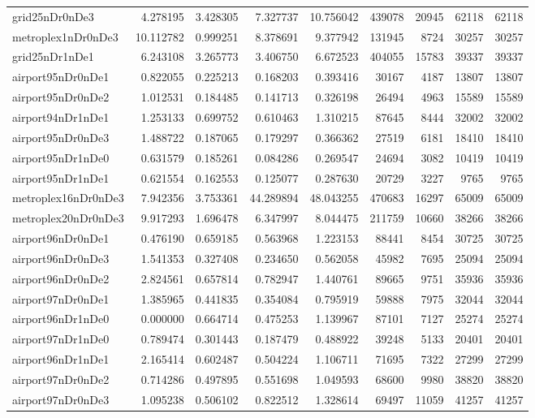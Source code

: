 \documentclass[../../../thesis.tex]{subfiles}
\begin{document}
\begin{longtable}{|l|r|r|r|r|r|r|r|r|}
grid25nDr0nDe3 & 4.278195 & 3.428305 & 7.327737 & 10.756042 & 439078 & 20945 & 62118 & 62118 \\
metroplex1nDr0nDe3 & 10.112782 & 0.999251 & 8.378691 & 9.377942 & 131945 & 8724 & 30257 & 30257 \\
grid25nDr1nDe1 & 6.243108 & 3.265773 & 3.406750 & 6.672523 & 404055 & 15783 & 39337 & 39337 \\
airport95nDr0nDe1 & 0.822055 & 0.225213 & 0.168203 & 0.393416 & 30167 & 4187 & 13807 & 13807 \\
airport95nDr0nDe2 & 1.012531 & 0.184485 & 0.141713 & 0.326198 & 26494 & 4963 & 15589 & 15589 \\
airport94nDr1nDe1 & 1.253133 & 0.699752 & 0.610463 & 1.310215 & 87645 & 8444 & 32002 & 32002 \\
airport95nDr0nDe3 & 1.488722 & 0.187065 & 0.179297 & 0.366362 & 27519 & 6181 & 18410 & 18410 \\
airport95nDr1nDe0 & 0.631579 & 0.185261 & 0.084286 & 0.269547 & 24694 & 3082 & 10419 & 10419 \\
airport95nDr1nDe1 & 0.621554 & 0.162553 & 0.125077 & 0.287630 & 20729 & 3227 & 9765 & 9765 \\
metroplex16nDr0nDe3 & 7.942356 & 3.753361 & 44.289894 & 48.043255 & 470683 & 16297 & 65009 & 65009 \\
metroplex20nDr0nDe3 & 9.917293 & 1.696478 & 6.347997 & 8.044475 & 211759 & 10660 & 38266 & 38266 \\
airport96nDr0nDe1 & 0.476190 & 0.659185 & 0.563968 & 1.223153 & 88441 & 8454 & 30725 & 30725 \\
airport96nDr0nDe3 & 1.541353 & 0.327408 & 0.234650 & 0.562058 & 45982 & 7695 & 25094 & 25094 \\
airport96nDr0nDe2 & 2.824561 & 0.657814 & 0.782947 & 1.440761 & 89665 & 9751 & 35936 & 35936 \\
airport97nDr0nDe1 & 1.385965 & 0.441835 & 0.354084 & 0.795919 & 59888 & 7975 & 32044 & 32044 \\
airport96nDr1nDe0 & 0.000000 & 0.664714 & 0.475253 & 1.139967 & 87101 & 7127 & 25274 & 25274 \\
airport97nDr1nDe0 & 0.789474 & 0.301443 & 0.187479 & 0.488922 & 39248 & 5133 & 20401 & 20401 \\
airport96nDr1nDe1 & 2.165414 & 0.602487 & 0.504224 & 1.106711 & 71695 & 7322 & 27299 & 27299 \\
airport97nDr0nDe2 & 0.714286 & 0.497895 & 0.551698 & 1.049593 & 68600 & 9980 & 38820 & 38820 \\
airport97nDr0nDe3 & 1.095238 & 0.506102 & 0.822512 & 1.328614 & 69497 & 11059 & 41257 & 41257 \\

\end{longtable}
\end{document}
